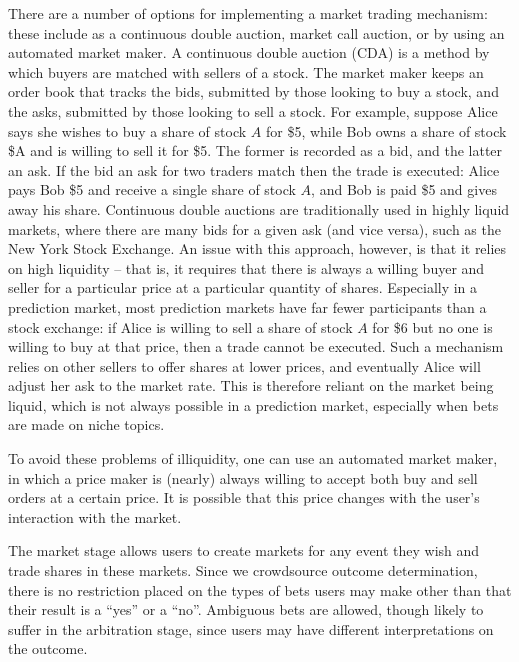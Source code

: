 There are a  number of options for implementing a market trading mechanism:
these include as a continuous double auction, market call auction, or by using
an automated market maker. A continuous double auction (CDA) is a method by
which buyers are matched with sellers of a stock. The market maker keeps an
order book that tracks the bids, submitted by those looking to buy a stock, and
the asks, submitted by those looking to sell a stock. For example, suppose
Alice says she wishes to buy a share of stock $A$ for \$5, while Bob owns a
share of stock \$A and is willing to sell it for \$5. The former is recorded as
a bid, and the latter an ask. If the bid an ask for two traders match then the
trade is executed: Alice pays Bob \$5 and receive a single share of stock $A$,
and Bob is paid \$5 and gives away his share. Continuous double auctions are
traditionally used in highly liquid markets, where there are many bids for a
given ask (and vice versa), such as the New York Stock Exchange. An issue with
this approach, however, is that it relies on high liquidity -- that is, it
requires that there is always a willing buyer and seller for a particular price
at a particular quantity of shares. Especially in a prediction market, most
prediction markets have far fewer participants than a stock exchange: if Alice
is willing to sell a share of stock $A$ for \$6 but no one is willing to buy at
that price, then a trade cannot be executed. Such a mechanism relies on other
sellers to offer shares at lower prices, and eventually Alice will adjust her
ask to the market rate. This is therefore reliant on the market being liquid,
which is not always possible in a prediction market, especially when bets are
made on niche topics.

To avoid these problems of illiquidity, one can use an automated market maker,
in which a price maker is (nearly) always willing to accept both buy and sell
orders at a certain price. It is possible that this price changes with the
user's interaction with the market.


The market stage allows users to create markets for any event they wish and
trade shares in these markets. Since we crowdsource outcome determination,
there is no restriction placed on the types of bets users may make other than
that their result is a ``yes'' or a ``no''. Ambiguous bets are allowed, though
likely to suffer in the arbitration stage, since users may have different
interpretations on the outcome.


